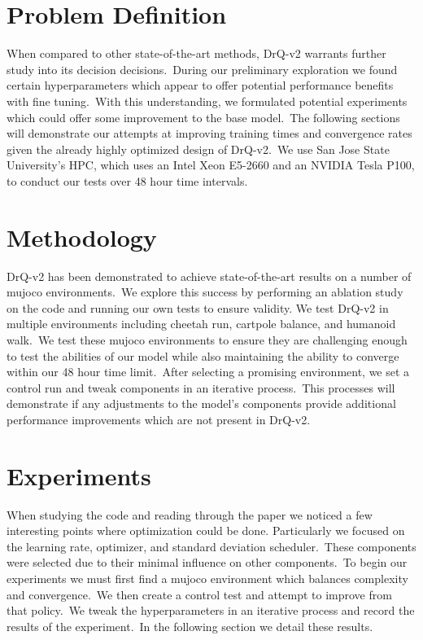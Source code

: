 \documentclass[conference]{./IEEEtran/IEEEtran} %
\begin{document}
    \section{Problem Definition}\label{sec:problem-definition}

    When compared to other state-of-the-art methods, DrQ-v2 warrants further study into its decision decisions.\ During our preliminary
    exploration we found certain hyperparameters which appear to offer potential performance benefits with fine tuning.\ With
    this understanding, we formulated potential experiments which could offer some improvement to the base model.\ The following sections will demonstrate our attempts at improving
    training times and convergence rates given the already highly optimized design of DrQ-v2.\ We use San Jose State University’s HPC,
    which uses an Intel Xeon E5-2660 and an NVIDIA Tesla P100, to conduct our tests over 48 hour time intervals.\

    \section{Methodology}\label{sec:methodology}

    DrQ-v2 has been demonstrated to achieve state-of-the-art results on a number of mujoco environments.\ We explore this success
    by performing an ablation study on the code and running our own tests to ensure validity. We test DrQ-v2 in multiple
    environments including cheetah run, cartpole balance, and humanoid walk.\ We test these mujoco environments to ensure they
    are challenging enough to test the abilities of our model while also maintaining the ability to converge within our 48 hour
    time limit.\ After selecting a promising environment, we set a control run and tweak components in an iterative process.\
    This processes will demonstrate if any adjustments to the model's components provide additional performance improvements which
    are not present in DrQ-v2.\

    \section{Experiments}\label{sec:experiments}

    When studying the code and reading through the paper we noticed a few interesting points where optimization could be done.
    Particularly we focused on the learning rate, optimizer, and standard deviation scheduler.\ These components were
    selected due to their minimal influence on other components.\ To begin our experiments we must first find a mujoco
    environment which balances complexity and convergence.\ We then create a control test and attempt to improve from that policy.\
    We tweak the hyperparameters in an iterative process and record the results of the experiment.\ In the following section we
    detail these results.\
\end{document}
